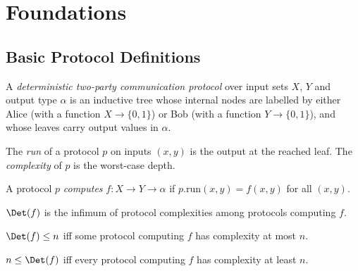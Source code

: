 \chapter{Foundations}

\section{Basic Protocol Definitions}

\begin{definition}
  \label{def:det_protocol}
  \leanok
  A \emph{deterministic two-party communication protocol} over input sets $X$, $Y$
  and output type $\alpha$ is an inductive tree whose internal nodes are labelled
  by either Alice (with a function $X \to \{0,1\}$) or Bob (with a function
  $Y \to \{0,1\}$), and whose leaves carry output values in $\alpha$.
\end{definition}

\begin{definition}
  \label{def:protocol_run}
  \leanok
  \leanok
  The \emph{run} of a protocol $p$ on inputs $(x, y)$ is the output at the reached leaf.
  The \emph{complexity} of $p$ is the worst-case depth.
\end{definition}

\begin{definition}[Computes]
  \label{def:computes}
  \leanok
  A protocol $p$ \emph{computes} $f : X \to Y \to \alpha$ if
  $p.\mathrm{run}(x,y) = f(x,y)$ for all $(x,y)$.
\end{definition}

\begin{definition}
  \label{def:det_cc}
  \leanok
  $\Det(f)$ is the infimum of protocol complexities among protocols computing $f$.
\end{definition}

\begin{lemma}
  \label{lem:det_cc_le_iff}
  \leanok
  $\Det(f) \le n$ iff some protocol computing $f$ has complexity at most $n$.
\end{lemma}

\begin{lemma}
  \label{lem:le_det_cc_iff}
  \leanok
  $n \le \Det(f)$ iff every protocol computing $f$ has complexity at least $n$.
\end{lemma}

